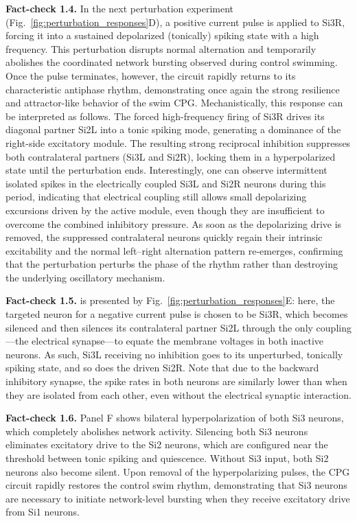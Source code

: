 \documentclass[nofootinbib,aip,amsmath,amssymb,preprint,twocolumn,floatfix,10pt]{revtex4-2}
\begin{document}
{\bf Fact-check 1.4.} In the next perturbation experiment (Fig.~\ref{fig:perturbation_responses}D), a positive current pulse is applied to Si3R, forcing it into a sustained depolarized (tonically) spiking state with a high frequency. This perturbation disrupts normal alternation and temporarily abolishes the coordinated network bursting observed during control swimming. Once the pulse terminates, however, the circuit rapidly returns to its characteristic antiphase rhythm, demonstrating once again the strong resilience and attractor-like behavior of the swim CPG.
Mechanistically, this response can be interpreted as follows. The forced high-frequency firing of Si3R drives its diagonal partner Si2L into a tonic spiking mode, generating a dominance of the right-side excitatory module. The resulting strong reciprocal inhibition suppresses both contralateral partners (Si3L and Si2R), locking them in a hyperpolarized state until the perturbation ends. Interestingly, one can observe intermittent isolated spikes in the electrically coupled Si3L and Si2R neurons during this period, indicating that electrical coupling still allows small depolarizing excursions driven by the active module, even though they are insufficient to overcome the combined inhibitory pressure. As soon as the depolarizing drive is removed, the suppressed contralateral neurons quickly regain their intrinsic excitability and the normal left--right alternation pattern re-emerges, confirming that the perturbation perturbs the phase of the rhythm rather than destroying the underlying oscillatory mechanism.



{\bf Fact-check 1.5.} is presented by Fig.~\ref{fig:perturbation_responses}E: here, the targeted neuron for a negative current pulse is chosen to be Si3R, which becomes silenced and then silences its contralateral partner Si2L through the only coupling---the electrical synapse---to equate the membrane voltages in both inactive neurons. As such, Si3L receiving no inhibition goes to its unperturbed, tonically spiking state, and so does the driven Si2R. Note that due to the backward inhibitory synapse, the spike rates in both neurons are similarly lower than when they are isolated from each other, even without the electrical synaptic interaction.

{\bf Fact-check 1.6.}
Panel F shows bilateral hyperpolarization of both Si3 neurons, which completely abolishes network activity. Silencing both Si3 neurons eliminates excitatory drive to the Si2 neurons, which are configured near the threshold between tonic spiking and quiescence. Without Si3 input, both Si2 neurons also become silent. Upon removal of the hyperpolarizing pulses, the CPG circuit rapidly restores the control swim rhythm, demonstrating that Si3 neurons are necessary to initiate network-level bursting when they receive excitatory drive from Si1 neurons.
\end{document}
